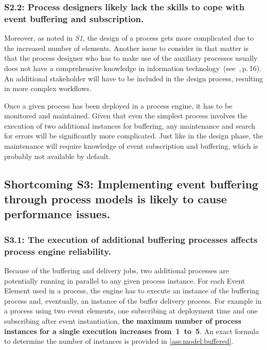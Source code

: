 \subsubsection*{S2.2: Process designers likely lack the skills to cope with event buffering and subscription.}
Moreover, as noted in \textit{S1}, the design of a process gets more complicated due to the increased number of elements.
Another issue to consider in that matter is that the process designer who has to make use of the auxiliary processes usually does not have a comprehensive knowledge in information technology~(see~\cite{weske:bpm-book},\,p.\,16). An additional stakeholder will have to be included in the design process, resulting in more complex workflows.

Once a given process has been deployed in a process engine, it has to be monitored and maintained.
Given that even the simplest process involves the execution of two additional instances for buffering, any maintenance and search for errors will be significantly more complicated.
Just like in the design phase, the maintenance will require knowledge of event subscription and buffering, which is probably not available by default.


\subsection*{Shortcoming S3: Implementing event buffering through process models is likely to cause performance issues.}

\subsubsection*{S3.1: The execution of additional buffering processes affects process engine reliability.}

Because of the buffering and delivery jobs, two additional processes are potentially running in parallel to any given process instance. For each Event Element used in a process, the engine has to execute an instance of the buffering process and, eventually, an instance of the buffer delivery process.
For example in a process using two event elements, one subscribing at deployment time and one subscribing after event instantiation, \textbf{the maximum number of process instances for a single execution increases from~1~to~5}. An exact formula to determine the number of instances is provided in \ref{ass:model:buffered}.



